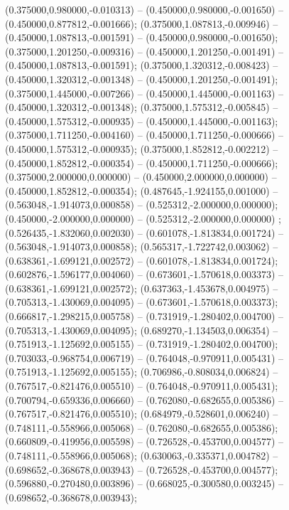  (0.375000,0.980000,-0.010313) -- (0.450000,0.980000,-0.001650) -- (0.450000,0.877812,-0.001666);
 (0.375000,1.087813,-0.009946) -- (0.450000,1.087813,-0.001591) -- (0.450000,0.980000,-0.001650);
 (0.375000,1.201250,-0.009316) -- (0.450000,1.201250,-0.001491) -- (0.450000,1.087813,-0.001591);
 (0.375000,1.320312,-0.008423) -- (0.450000,1.320312,-0.001348) -- (0.450000,1.201250,-0.001491);
 (0.375000,1.445000,-0.007266) -- (0.450000,1.445000,-0.001163) -- (0.450000,1.320312,-0.001348);
 (0.375000,1.575312,-0.005845) -- (0.450000,1.575312,-0.000935) -- (0.450000,1.445000,-0.001163);
 (0.375000,1.711250,-0.004160) -- (0.450000,1.711250,-0.000666) -- (0.450000,1.575312,-0.000935);
 (0.375000,1.852812,-0.002212) -- (0.450000,1.852812,-0.000354) -- (0.450000,1.711250,-0.000666);
 (0.375000,2.000000,0.000000) -- (0.450000,2.000000,0.000000) -- (0.450000,1.852812,-0.000354);
 (0.487645,-1.924155,0.001000) -- (0.563048,-1.914073,0.000858) -- (0.525312,-2.000000,0.000000);
 (0.450000,-2.000000,0.000000) -- (0.525312,-2.000000,0.000000) ;
 (0.526435,-1.832060,0.002030) -- (0.601078,-1.813834,0.001724) -- (0.563048,-1.914073,0.000858);
 (0.565317,-1.722742,0.003062) -- (0.638361,-1.699121,0.002572) -- (0.601078,-1.813834,0.001724);
 (0.602876,-1.596177,0.004060) -- (0.673601,-1.570618,0.003373) -- (0.638361,-1.699121,0.002572);
 (0.637363,-1.453678,0.004975) -- (0.705313,-1.430069,0.004095) -- (0.673601,-1.570618,0.003373);
 (0.666817,-1.298215,0.005758) -- (0.731919,-1.280402,0.004700) -- (0.705313,-1.430069,0.004095);
 (0.689270,-1.134503,0.006354) -- (0.751913,-1.125692,0.005155) -- (0.731919,-1.280402,0.004700);
 (0.703033,-0.968754,0.006719) -- (0.764048,-0.970911,0.005431) -- (0.751913,-1.125692,0.005155);
 (0.706986,-0.808034,0.006824) -- (0.767517,-0.821476,0.005510) -- (0.764048,-0.970911,0.005431);
 (0.700794,-0.659336,0.006660) -- (0.762080,-0.682655,0.005386) -- (0.767517,-0.821476,0.005510);
 (0.684979,-0.528601,0.006240) -- (0.748111,-0.558966,0.005068) -- (0.762080,-0.682655,0.005386);
 (0.660809,-0.419956,0.005598) -- (0.726528,-0.453700,0.004577) -- (0.748111,-0.558966,0.005068);
 (0.630063,-0.335371,0.004782) -- (0.698652,-0.368678,0.003943) -- (0.726528,-0.453700,0.004577);
 (0.596880,-0.270480,0.003896) -- (0.668025,-0.300580,0.003245) -- (0.698652,-0.368678,0.003943);
